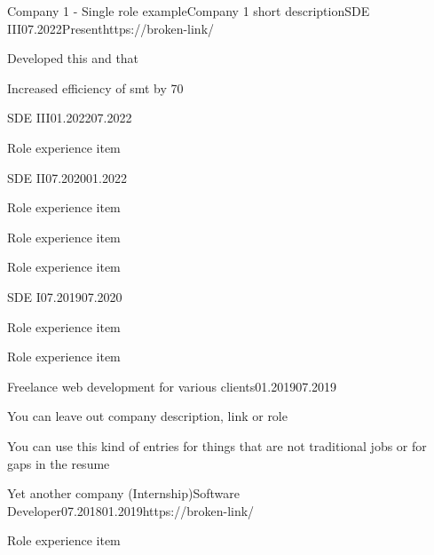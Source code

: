 \begin{company}{Company 1 - Single role example}{Company 1 short description}{SDE III}{07.2022}{Present}{https://broken-link/}
    \item Developed this and that
    \item Increased efficiency of smt by 70%
\end{company}
    
\begin{multirolecompanyrole}{SDE III}{01.2022}{07.2022}
    \item Role experience item
\end{multirolecompanyrole}
\begin{multirolecompanyrole}{SDE II}{07.2020}{01.2022}
    \item Role experience item
    \item Role experience item
    \item Role experience item
\end{multirolecompanyrole}
\begin{multirolecompanyrole}{SDE I}{07.2019}{07.2020}
    \item Role experience item
    \item Role experience item
\end{multirolecompanyrole}
    
\begin{company}{Freelance web development for various clients}{}{}{01.2019}{07.2019}{}
    \item You can leave out company description, link or role
    \item You can use this kind of entries for things that are not traditional jobs or for gaps in the resume
\end{company}
    
\begin{company}{Yet another company (Internship)}{}{Software Developer}{07.2018}{01.2019}{https://broken-link/}
\item Role experience item
\end{company}
